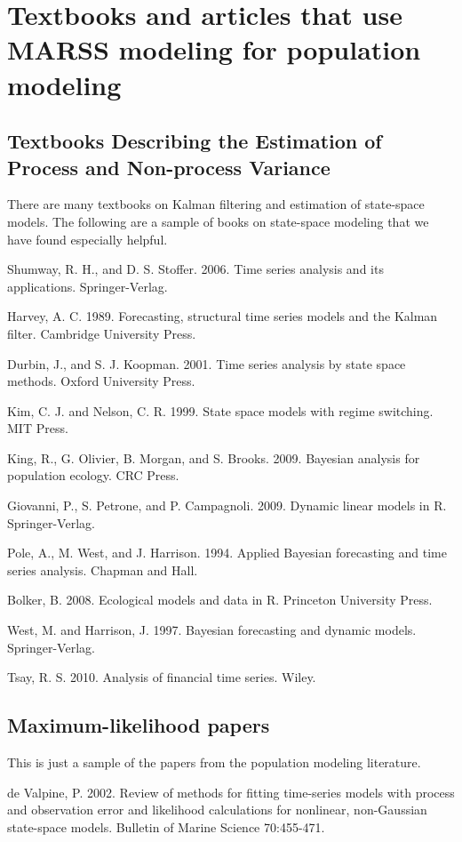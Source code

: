 \chapter{Textbooks and articles that use MARSS modeling for population modeling}
\label{chap:SSreferences}
\section*{Textbooks Describing the Estimation of Process and Non-process Variance}
There are many textbooks on Kalman filtering and estimation of state-space models.  The following are a sample of books on state-space modeling that we have found especially helpful.
\bigskip

Shumway, R. H., and D. S. Stoffer. 2006. Time series analysis and its applications. Springer-Verlag.

Harvey, A. C. 1989. Forecasting, structural time series models and the Kalman filter. Cambridge University Press.

Durbin, J., and S. J. Koopman. 2001. Time series analysis by state space methods. Oxford University Press.

Kim, C. J. and Nelson, C. R. 1999. State space models with regime switching. MIT Press.

King, R., G. Olivier, B. Morgan, and S. Brooks.  2009. Bayesian analysis for population ecology. CRC Press.

Giovanni, P., S. Petrone, and P. Campagnoli. 2009. Dynamic linear models in R. Springer-Verlag.

Pole, A., M. West, and J. Harrison. 1994. Applied Bayesian forecasting and time series analysis. Chapman and Hall.

Bolker, B. 2008. Ecological models and data in R.  Princeton University Press.

West, M. and Harrison, J. 1997. Bayesian forecasting and dynamic models. Springer-Verlag.

Tsay, R. S. 2010. Analysis of financial time series. Wiley.

\section*{Maximum-likelihood papers}
This is just a sample of the papers from the population modeling literature.
\bigskip

de Valpine, P. 2002. Review of methods for fitting time-series models with process and observation error and likelihood calculations for nonlinear, non-Gaussian state-space models. Bulletin of Marine Science 70:455-471.

